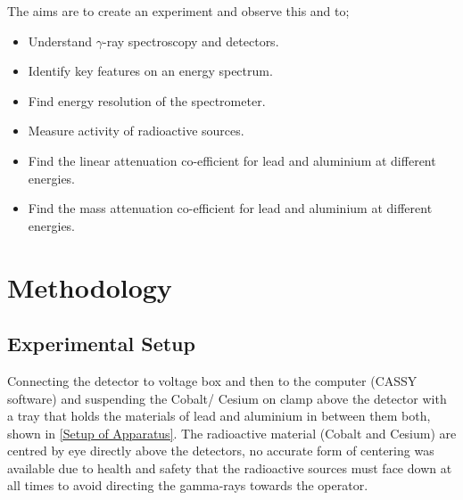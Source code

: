 \documentclass[12pt]{article}
\begin{document}
The aims are to create an experiment and observe this and to; \cite{Exp.C-2020}
\begin{itemize}
    \item Understand $\gamma$-ray spectroscopy and detectors.
    \item Identify key features on an energy spectrum.
    \item Find energy resolution of the spectrometer.
    \item Measure activity of radioactive sources.
    \item Find the linear attenuation co-efficient for lead and aluminium at different energies.
    \item Find the mass attenuation co-efficient for lead and aluminium at different energies.
\end{itemize}

\section{Methodology}
\label{Methodology Section}
\subsection{Experimental Setup}
\label{Experimental Setup Subsection}
  
Connecting the detector to voltage box and then to the computer (CASSY software) and suspending the Cobalt/ Cesium on clamp above the detector with a tray that holds the materials of lead and aluminium in between them both, shown in \cref{Setup of Apparatus}. The radioactive material (Cobalt and Cesium) are centred by eye directly above the detectors, no accurate form of centering was available due to health and safety that the radioactive sources must face down at all times to avoid directing the gamma-rays towards the operator.
\end{document}
